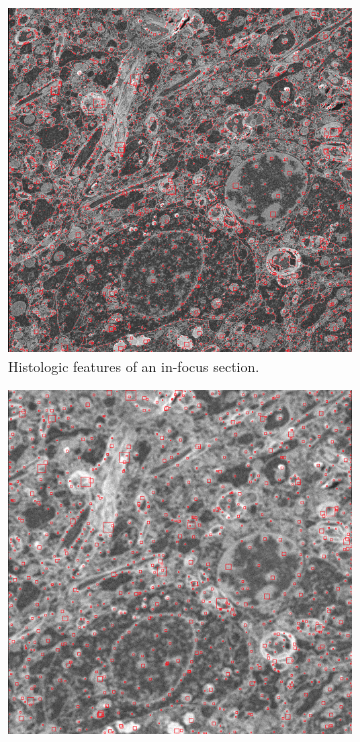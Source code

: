 \documentclass[sigconf,nonacm]{acmart}
\begin{document}
\begin{figure}
    \centering
    \begin{subfigure}[b]{0.5\textwidth}
        \centering
        \includegraphics[width=1\linewidth]{in_focus.png}
        \caption{Histologic features of an in-focus section.}
        \label{subfig:infocus}
    \end{subfigure}
    \par\medskip
    \begin{subfigure}[b]{0.5\textwidth}
        \centering
        \includegraphics[width=1\linewidth]{out_of_focus.png}

\end{subfigure}
\end{figure}
\end{document}
